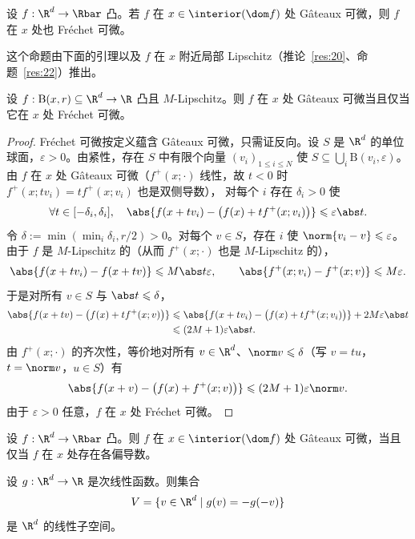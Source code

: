 \begin{proposition}
\label{res:52}
设 $f:\R^d\to\Rbar$ 凸。若 $f$ 在 $x\in\interior(\dom f)$ 处 Gâteaux 可微，则 $f$ 在 $x$ 处也 Fréchet 可微。
\end{proposition}

这个命题由下面的引理以及 $f$ 在 $x$ 附近局部 Lipschitz（推论~\ref{res:20}、命题~\ref{res:22}）推出。

\begin{lemma}
\label{res:53}
设 $f:\mathrm B(x,r)\subseteq\R^d\to\R$ 凸且 $M$-Lipschitz。则 $f$ 在 $x$ 处 Gâteaux 可微当且仅当它在 $x$ 处 Fréchet 可微。
\end{lemma}

\begin{proof}
Fréchet 可微按定义蕴含 Gâteaux 可微，只需证反向。设 $S$ 是 $\R^d$ 的单位球面，$\varepsilon>0$。由紧性，存在 $S$ 中有限个向量 $(v_i)_{1\leqslant i\leqslant N}$
使 $S\subseteq\bigcup_i\mathrm B(v_i,\varepsilon)$。由 $f$ 在 $x$ 处 Gâteaux 可微（$f^+(x;\cdot)$ 线性，故 $t<0$ 时 $f^+(x;tv_i)=tf^+(x;v_i)$ 也是双侧导数），
对每个 $i$ 存在 $\delta_i>0$ 使
\[
  \forall t\in[-\delta_i,\delta_i],\quad\abs{f(x+tv_i)-\bigl(f(x)+tf^+(x;v_i)\bigr)}\leqslant\varepsilon\abs t .
\]
令 $\delta:=\min(\min_i\delta_i,r/2)>0$。对每个 $v\in S$，存在 $i$ 使 $\norm{v_i-v}\leqslant\varepsilon$。由于 $f$ 是 $M$-Lipschitz 的（从而 $f^+(x;\cdot)$ 也是 $M$-Lipschitz 的），
\[
  \abs{f(x+tv_i)-f(x+tv)}\leqslant M\abs t\varepsilon,\qquad\abs{f^+(x;v_i)-f^+(x;v)}\leqslant M\varepsilon .
\]
于是对所有 $v\in S$ 与 $\abs t\leqslant\delta$，
\begin{align*}
  \abs{f(x+tv)-\bigl(f(x)+tf^+(x;v)\bigr)}
  &\leqslant\abs{f(x+tv_i)-\bigl(f(x)+tf^+(x;v_i)\bigr)}+2M\varepsilon\abs t\\
  &\leqslant(2M+1)\varepsilon\abs t .
\end{align*}
由 $f^+(x;\cdot)$ 的齐次性，等价地对所有 $v\in\R^d$、$\norm v\leqslant\delta$（写 $v=tu$，$t=\norm v$，$u\in S$）有
\[
  \abs{f(x+v)-\bigl(f(x)+f^+(x;v)\bigr)}\leqslant(2M+1)\varepsilon\norm v .
\]
由于 $\varepsilon>0$ 任意，$f$ 在 $x$ 处 Fréchet 可微。
\end{proof}

\begin{proposition}
\label{res:54}
设 $f:\R^d\to\Rbar$ 凸。则 $f$ 在 $x\in\interior(\dom f)$ 处 Gâteaux 可微，当且仅当 $f$ 在 $x$ 处存在各偏导数。
\end{proposition}

\begin{lemma}
\label{res:55}
设 $g:\R^d\to\R$ 是次线性函数。则集合
\[
  V=\{v\in\R^d\mid g(v)=-g(-v)\}
\]
是 $\R^d$ 的线性子空间。
\end{lemma}

